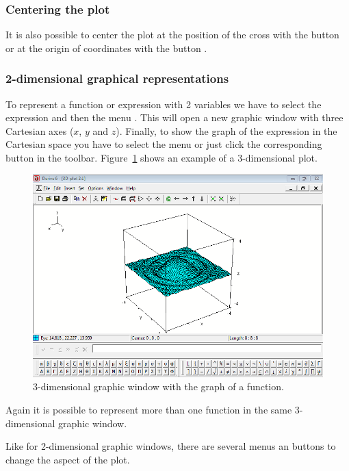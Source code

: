 \subsubsection*{Centering the plot}
It is also possible to center the plot at the position of the cross with the button  or at the origin of coordinates with the button .


\subsubsection*{2-dimensional graphical representations}
To represent a function or expression with 2 variables we have to select the expression and then the menu .
This will open a new graphic window with three Cartesian axes ($x$, $y$ and $z$).
Finally, to show the graph of the expression in the Cartesian space you have to select the menu  or just click the corresponding button in the toolbar. 
Figure~\ref{g:3d-plot} shows an example of a 3-dimensional plot.

\begin{figure}[h!]
\begin{center}
\includegraphics[scale=0.6]{img/introduction/3d-plot}
\caption{3-dimensional graphic window with the graph of a function.}
\label{g:3d-plot}
\end{center}
\end{figure}

Again it is possible to represent more than one function in the same 3-dimensional graphic window. 

Like for 2-dimensional graphic windows, there are several menus an buttons to change the aspect of the plot.

